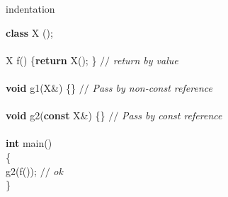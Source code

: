 %
%
\expandafter\ifx\csname indentation\endcsname\relax%
\newlength{\indentation}\fi
\setlength{\indentation}{0.5em}
\begin{flushleft}
{\bf class} X ();\mbox{}\\
\mbox{}\\
X f() \{{\bf return} X(); \} {$//$\it{} return by value {}\mbox{}\\
}\mbox{}\\
{\bf void} g1(X\&) \{\} {$//$\it{} Pass by non-const reference {}\mbox{}\\
}\mbox{}\\
{\bf void} g2({\bf const} X\&) \{\} {$//$\it{} Pass by const reference{}\mbox{}\\
}\mbox{}\\
{\bf int} main()\mbox{}\\
\{\mbox{}\\
\hspace*{2\indentation}g2(f()); {$//$\it{} ok {}\mbox{}\\
}\}\mbox{}\\
\end{flushleft}

